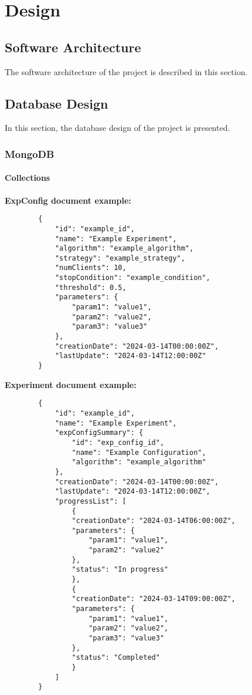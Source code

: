 \chapter{Design}

\section{Software Architecture}

The software architecture of the project is described in this section.

\section{Database Design}

In this section, the database design of the project is presented.
\newpage
\subsection{MongoDB}
\subsubsection{Collections}
\textbf{ExpConfig document example:} \begin{verbatim}
        {
            "id": "example_id",
            "name": "Example Experiment",
            "algorithm": "example_algorithm",
            "strategy": "example_strategy",
            "numClients": 10,
            "stopCondition": "example_condition",
            "threshold": 0.5,
            "parameters": {
                "param1": "value1",
                "param2": "value2",
                "param3": "value3"
            },
            "creationDate": "2024-03-14T00:00:00Z",
            "lastUpdate": "2024-03-14T12:00:00Z"
        }
    \end{verbatim}
\textbf{Experiment document example:} \begin{verbatim}
        {
            "id": "example_id",
            "name": "Example Experiment",
            "expConfigSummary": {
                "id": "exp_config_id",
                "name": "Example Configuration",
                "algorithm": "example_algorithm"
            },
            "creationDate": "2024-03-14T00:00:00Z",
            "lastUpdate": "2024-03-14T12:00:00Z",
            "progressList": [
                {
                "creationDate": "2024-03-14T06:00:00Z",
                "parameters": {
                    "param1": "value1",
                    "param2": "value2"
                },
                "status": "In progress"
                },
                {
                "creationDate": "2024-03-14T09:00:00Z",
                "parameters": {
                    "param1": "value1",
                    "param2": "value2",
                    "param3": "value3"
                },
                "status": "Completed"
                }
            ]
        }
    \end{verbatim}

